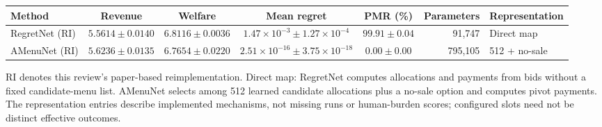 \begin{table}[!t]
\centering\footnotesize
{}
\label{tab:phase1-main}
\setlength{\tabcolsep}{4pt}
\begin{tabular}{lccccrl}
\toprule
Method & Revenue & Welfare & Mean regret & PMR (\%) & Parameters & Representation \\
\midrule
RegretNet (RI) & $5.5614\pm 0.0140$ & $6.8116\pm 0.0036$ & $1.47\times10^{-3}\pm 1.27\times10^{-4}$ & $99.91\pm 0.04$ & 91,747 & Direct map \\
AMenuNet (RI) & $5.6236\pm 0.0135$ & $6.7654\pm 0.0220$ & $2.51\times10^{-16}\pm 3.75\times10^{-18}$ & $0.00\pm 0.00$ & 795,105 & 512 + no-sale \\
\bottomrule
\end{tabular}
\par\smallskip\begin{minipage}{0.98\textwidth}\footnotesize RI denotes this review's paper-based reimplementation. Direct map: RegretNet computes allocations and payments from bids without a fixed candidate-menu list. AMenuNet selects among 512 learned candidate allocations plus a no-sale option and computes pivot payments. The representation entries describe implemented mechanisms, not missing runs or human-burden scores; configured slots need not be distinct effective outcomes.\end{minipage}
\end{table}
